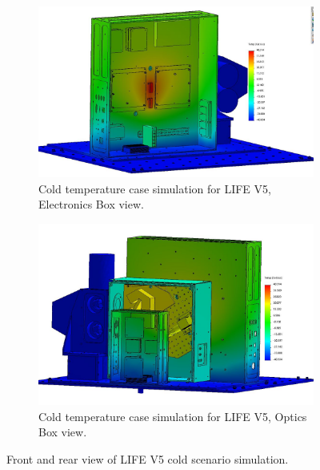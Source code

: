 \begin{figure}
    \centering
    \begin{subfigure}[h]{0.9\textwidth}
        \centering
        \includegraphics[width=\textwidth]{chap3_images/LIFE_V5_initial_images/Iteration_1_ebox_no_labels.JPG}
        \caption{Cold temperature case simulation for LIFE V5, Electronics Box view.}
        \label{fig:LIFE_V5_TA_COLD_EBOX}
    \end{subfigure}
    \begin{subfigure}[h]{0.9\textwidth}
        \centering
        \includegraphics[width=\textwidth]{chap3_images/LIFE_V5_initial_images/Iteration_1_no_labels.JPG}
        \caption{Cold temperature case simulation for LIFE V5, Optics Box view.}
        \label{fig:LIFE_V4_TA_COLD_OBOX}
    \end{subfigure}
    \caption{Front and rear view of LIFE V5 cold scenario simulation.}
    \label{LIFE_V5_Prelim_TA_COLD}
\end{figure}

